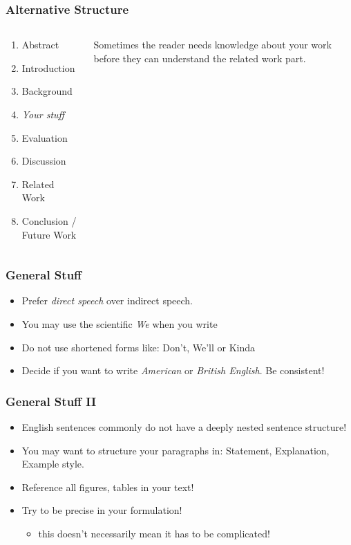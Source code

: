 \documentclass[xcolor={usenames,dvipsnames}]{beamer}
\begin{document}
\begin{frame}
	\frametitle{Alternative Structure}

	\begin{columns}
		\begin{column}{0.5\textwidth}
			\begin{enumerate}
				\item Abstract
				\item Introduction
				\item Background
				\item \emph{Your stuff}
				\item Evaluation
				\item Discussion
				\item Related Work
				\item Conclusion / Future Work
			\end{enumerate}
		\end{column}
		\begin{column}{0.5\textwidth}
			\alert{Sometimes the reader needs knowledge about your work before they can understand the related work part.}
		\end{column}
	\end{columns}
\end{frame}

\begin{frame}
	\frametitle{General Stuff}

	\begin{itemize}
		\item Prefer \emph{direct speech} over indirect speech.
		\item You may use the scientific \emph{We} when you write
		\item Do not use shortened forms like: \alert{Don't}, \alert{We'll} or \alert{Kinda}
		\item Decide if you want to write \emph{American} or \emph{British English}. Be consistent!
	\end{itemize}
\end{frame}

\begin{frame}
	\frametitle{General Stuff II}

	\begin{itemize}
		\item English sentences commonly do not have a deeply nested sentence structure!

		\item You may want to structure your paragraphs in: Statement, Explanation, Example style.

		\item Reference \alert{all} figures, tables in your text!

		\item Try to be \alert{precise} in your formulation!
			\begin{itemize}
				\item this doesn't necessarily mean it has to be complicated!
			\end{itemize}
	\end{itemize}
\end{frame}
\end{document}
